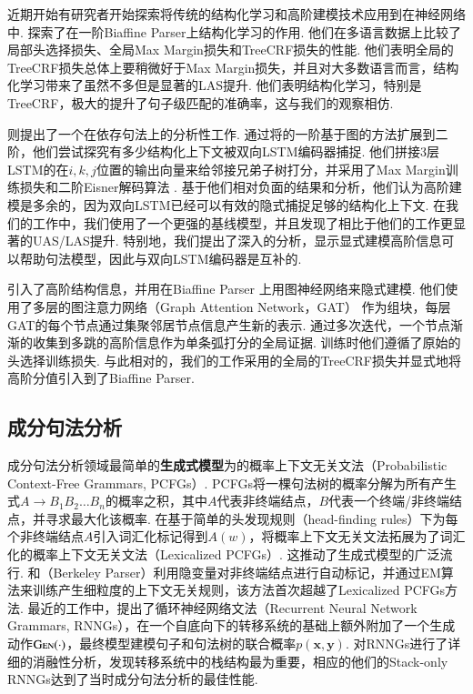 近期开始有研究者开始探索将传统的结构化学习和高阶建模技术应用到在神经网络中.
\citet{zhang-etal-2019-empirical}探索了在一阶Biaffine Parser上结构化学习的作用.
他们在多语言数据上比较了局部头选择损失、全局Max Margin损失和TreeCRF损失的性能.
他们表明全局的TreeCRF损失总体上要稍微好于Max Margin损失，并且对大多数语言而言，结构化学习带来了虽然不多但是显著的LAS提升.
他们表明结构化学习，特别是TreeCRF，极大的提升了句子级匹配的准确率，这与我们的观察相仿.

\citet{falenska-kuhn-2019-non}则提出了一个在依存句法上的分析性工作.
通过将\citet{kiperwasser-goldberg-2016-simple}的一阶基于图的方法扩展到二阶，他们尝试探究有多少结构化上下文被双向LSTM编码器捕捉.
他们拼接3层LSTM的在$i,k,j$位置的输出向量来给邻接兄弟子树打分，并采用了Max Margin训练损失和二阶Eisner解码算法 \citep{mcdonald-pereira-2006-online}.
基于他们相对负面的结果和分析，他们认为高阶建模是多余的，因为双向LSTM已经可以有效的隐式捕捉足够的结构化上下文.
在我们的工作中，我们使用了一个更强的基线模型，并且发现了相比于他们的工作更显著的UAS/LAS提升.
特别地，我们提出了深入的分析，显示显式建模高阶信息可以帮助句法模型，因此与双向LSTM编码器是互补的.

\citet{ji-etal-2019-graph}引入了高阶结构信息，并用在Biaffine Parser \citep{dozat-etal-2017-biaffine}上用图神经网络来隐式建模.
他们使用了多层的图注意力网络（Graph Attention Network，GAT） \citep{velickovic-etal-2018-graph}作为组块，每层GAT的每个节点通过集聚邻居节点信息产生新的表示.
通过多次迭代，一个节点渐渐的收集到多跳的高阶信息作为单条弧打分的全局证据.
训练时他们遵循了原始的头选择训练损失.
与此相对的，我们的工作采用的全局的TreeCRF损失并显式地将高阶分值引入到了Biaffine Parser.

\subsection{成分句法分析}

成分句法分析领域最简单的\textbf{生成式模型}为的概率上下文无关文法（Probabilistic Context-Free Grammars, PCFGs）.
PCFGs将一棵句法树的概率分解为所有产生式$A\rightarrow B_1B_2\dots B_n$的概率之积，其中$A$代表非终端结点，$B$代表一个终端/非终端结点，并寻求最大化该概率.
\citet{collins-1997-three}在基于简单的头发现规则（head-finding rules）下为每个非终端结点$A$引入词汇化标记得到$A(w)$，将概率上下文无关文法拓展为了词汇化的概率上下文无关文法（Lexicalized PCFGs）.
这推动了生成式模型的广泛流行.
\citet{matsuzaki-etal-2005-probabilistic}和\citet{petrov-etal-2006-learning}（Berkeley Parser）利用隐变量对非终端结点进行自动标记，并通过EM算法来训练产生细粒度的上下文无关规则，该方法首次超越了Lexicalized PCFGs方法.
最近的工作中，\citet{dyer-etal-2016-recurrent}提出了循环神经网络文法（Recurrent Neural Network Grammars, RNNGs），在一个自底向下的转移系统的基础上额外附加了一个生成动作$\textsc{Gen}(\cdot)$，最终模型建模句子和句法树的联合概率$p(\boldsymbol{x},\boldsymbol{y})$.
\citet{kuncoro-etal-2017-recurrent}对RNNGs进行了详细的消融性分析，发现转移系统中的栈结构最为重要，相应的他们的Stack-only RNNGs达到了当时成分句法分析的最佳性能.

